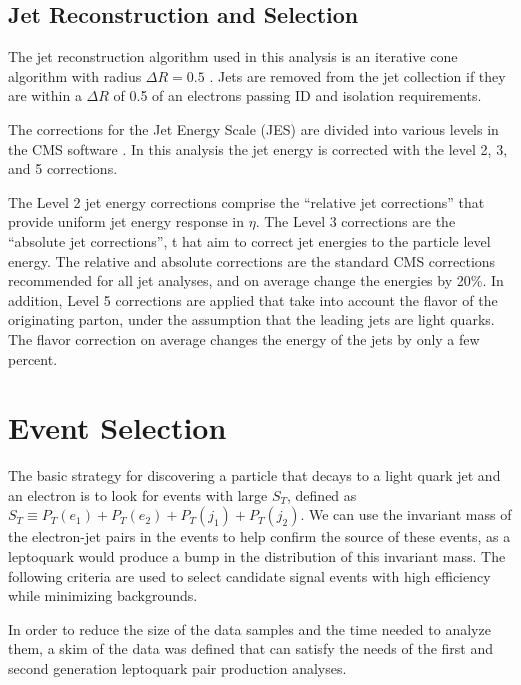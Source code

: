 \documentclass{cmspaper}
\begin{document}
\begin{linenumbers}
\subsection{Jet Reconstruction and Selection} \label{sec:jet}

The jet reconstruction algorithm used in this analysis is an 
iterative cone algorithm with radius $\Delta R=0.5$ \cite{JetAlg}.
Jets are removed   
from the jet collection if they are 
within a $\Delta R$ of 0.5 of an
electrons passing ID and isolation requirements.

The corrections for the Jet Energy Scale (JES) 
are divided into various levels in the CMS software \cite{JES}.  
In this analysis the jet energy is corrected with the 
level 2, 3, and 5 corrections.

The Level 2 jet energy corrections comprise the 
``relative jet corrections'' that provide 
uniform jet energy response in $\eta$.  
The Level 3 corrections are the ``absolute jet corrections'', t
hat aim to correct jet energies to the particle level energy. 
The relative and absolute corrections are the standard CMS 
corrections recommended for all jet analyses,
and on average change the energies by 20\%.
In addition, Level 5 corrections are applied that take into
account the flavor of the originating parton, under the assumption that the
leading jets are light quarks.
The flavor correction on average changes the energy of the jets by 
only a few percent.

\section{Event Selection} \label{sec:eventSelection}
The basic strategy for discovering a 
particle that decays to a light quark jet and an electron 
is to look for events with large $S_T$, defined as
$S_T\equiv P_T(e_1)+P_T(e_2)+P_T(j_1)+P_T(j_2)$.
We can use
the invariant mass of the electron-jet pairs in the events to help
confirm the source of these events, as a leptoquark would produce 
a bump in the distribution of this invariant mass.
The following criteria are used to select candidate signal events
with high efficiency
while minimizing backgrounds.


In order to reduce the size of the data samples and the time 
needed to analyze them, a skim of the 
data was defined
that can satisfy the needs of the
first and second generation leptoquark pair production analyses.


\end{linenumbers}
\end{document}
